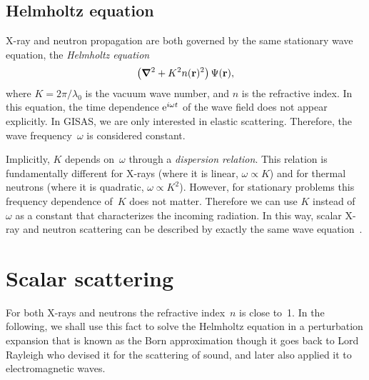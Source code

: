 
\subsection{Helmholtz equation}

X-ray and neutron propagation are both governed by
the same stationary wave equation,
the \textit{Helmholtz equation}
\begin{equation}\label{eq:Helmholtz}
  \left(\bm{\nabla}^2+K^2n(\mathbf{r})^2\right)\Psi(\mathbf{r}),
\end{equation}
where $K=2\pi/\lambda_0$ is the vacuum wave number,
and $n$ is the refractive index.
In this equation,
the time dependence ${\rm e}^{i\omega t}$ of the wave field
does not appear explicitly.
In GISAS, we are only interested in elastic scattering.
Therefore, the wave frequency~$\omega$ is considered constant.

Implicitly, $K$ depends on~$\omega$ through a \textit{dispersion relation}.
This relation is fundamentally different for
X-rays (where it is linear, $\omega\propto K$)
and for thermal neutrons (where it is quadratic, $\omega\propto K^2$).
However, for stationary problems
this frequency dependence of~$K$ does not matter.
Therefore we can use $K$ instead of~$\omega$ as a constant
that characterizes the incoming radiation.
In this way, scalar X-ray and neutron scattering can be described by exactly
the same wave equation~.



\section{Scalar scattering}

For both X-rays and neutrons the refractive index~$n$ is close to~1.
In the following,
we shall use this fact to solve the Helmholtz equation 
in a perturbation expansion
that is known as the Born approximation
though it goes back to Lord Rayleigh
who devised it for the scattering of sound,
and later also applied it to electromagnetic waves.

